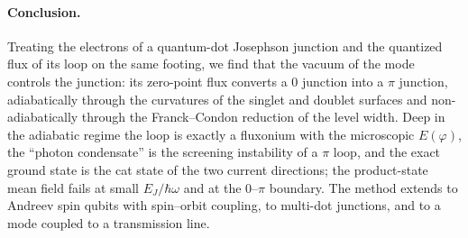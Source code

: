 \paragraph*{Conclusion.}
Treating the electrons of a quantum-dot Josephson junction and the quantized flux of its loop on the
same footing, we find that the vacuum of the mode controls the junction: its zero-point flux converts a
$0$ junction into a $\pi$ junction, adiabatically through the curvatures of the singlet and doublet
surfaces and non-adiabatically through the Franck--Condon reduction of the level width. Deep in the
adiabatic regime the loop is exactly a fluxonium with the microscopic $E(\varphi)$, the ``photon
condensate'' is the screening instability of a $\pi$ loop, and the exact ground state is the cat state of
the two current directions; the product-state mean field fails at small $E_J/\hbar\omega$ and at the
$0$--$\pi$ boundary. The method extends to Andreev spin qubits with spin--orbit coupling, to multi-dot
junctions, and to a mode coupled to a transmission line.
